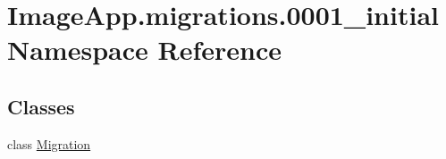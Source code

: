 \hypertarget{namespace_image_app_1_1migrations_1_10001__initial}{}\section{Image\+App.\+migrations.0001\+\_\+initial Namespace Reference}
\label{namespace_image_app_1_1migrations_1_10001__initial}
\subsection*{Classes}
\begin{DoxyCompactItemize}
\item 
class \mbox{\hyperlink{class_image_app_1_1migrations_1_10001__initial_1_1_migration}{Migration}}
\end{DoxyCompactItemize}
